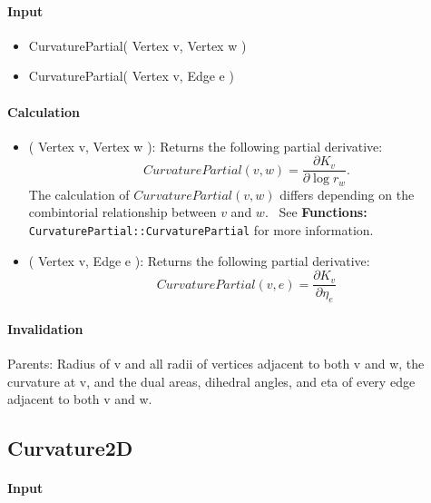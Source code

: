 \paragraph{Input}

\begin{itemize}
\item CurvaturePartial( Vertex v, Vertex w )

\item CurvaturePartial( Vertex v, Edge e )
\end{itemize}

\paragraph{Calculation}

\begin{itemize}
\item ( Vertex v, Vertex w ): Returns the following partial derivative:%
\begin{equation*}
CurvaturePartial(v,w)=\frac{\partial K_{v}}{\partial \log r_{w}}.
\end{equation*}%
The calculation of $CurvaturePartial(v,w)$ differs depending on the
combintorial relationship between $v$ and $w$. \ See \textbf{Functions: }%
\texttt{CurvaturePartial::CurvaturePartial} for more information.

\item ( Vertex v, Edge e ): Returns the following partial derivative: 
\begin{equation*}
CurvaturePartial(v,e)=\frac{\partial K_{v}}{\partial \eta _{e}}
\end{equation*}
\end{itemize}

\paragraph{Invalidation}

Parents: Radius of v and all radii of vertices adjacent to both v and w, the
curvature at v, and the dual areas, dihedral angles, and eta of every edge
adjacent to both v and w.

\subsection{Curvature2D}

\paragraph{Input}

